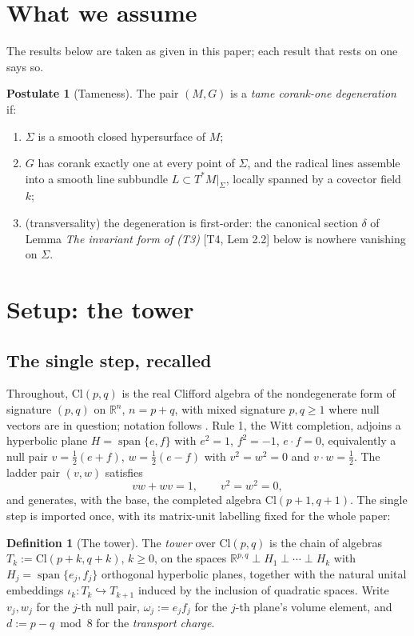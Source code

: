 \documentclass[11pt]{article}
\theoremstyle{definition}
\newtheorem{definition}[theorem]{Definition}
\newtheorem{postulate}[theorem]{Postulate}
\theoremstyle{plain}
\providecommand{\Cl}{}\renewcommand{\Cl}{\mathrm{Cl}}
\providecommand{\R}{}\renewcommand{\R}{\mathbb{R}}
\providecommand{\Sig}{}\renewcommand{\Sig}{\Sigma}
\providecommand{\shL}{}\renewcommand{\shL}{L}
\begin{document}
\section*{What we assume}
The results below are taken as given in this paper; each result that rests on one says so.
\begin{postulate}[Tameness]\label{c:sheaf.tameness}
The pair $(M, G)$ is a \emph{tame corank-one degeneration} if:
\begin{enumerate}
\item[(T1)] $\Sig$ is a smooth closed hypersurface of $M$;
\item[(T2)] $G$ has corank exactly one at every point of $\Sig$, and the radical lines assemble into a smooth line subbundle $\shL \subset T^*M|_\Sig$, locally spanned by a covector field $k$;
\item[(T3)] (transversality) the degeneration is first-order: the canonical section $\delta$ of Lemma \emph{The invariant form of (T3)} [T4, Lem 2.2] below is nowhere vanishing on $\Sig$.
\end{enumerate}
\end{postulate}

\section{Setup: the tower}

\subsection*{The single step, recalled}
\label{c:note.tower.setting-single-step-recalled}
Throughout, $\Cl(p,q)$ is the real Clifford algebra of the nondegenerate form of signature $(p,q)$ on $\R^n$, $n = p + q$, with mixed signature $p, q \geq 1$ where null vectors are in question; notation follows \cite{ButlerT1}. Rule 1, the Witt completion, adjoins a hyperbolic plane $H = \operatorname{span}\{e, f\}$ with $e^2 = 1$, $f^2 = -1$, $e \cdot f = 0$, equivalently a null pair $v = \tfrac12(e+f)$, $w = \tfrac12(e-f)$ with $v^2 = w^2 = 0$ and $v \cdot w = \tfrac12$. The ladder pair $(v, w)$ satisfies
\begin{equation}
vw + wv = 1, \qquad v^2 = w^2 = 0,
\end{equation}
and generates, with the base, the completed algebra $\Cl(p{+}1, q{+}1)$. The single step is imported once, with its matrix-unit labelling fixed for the whole paper:

\begin{definition}[The tower]\label{c:obj.tower.tower}
The \emph{tower} over $\Cl(p,q)$ is the chain of algebras $T_k := \Cl(p{+}k, q{+}k)$, $k \geq 0$, on the spaces $\R^{p,q} \perp H_1 \perp \cdots \perp H_k$ with $H_j = \operatorname{span}\{e_j, f_j\}$ orthogonal hyperbolic planes, together with the natural unital embeddings $\iota_k : T_k \hookrightarrow T_{k+1}$ induced by the inclusion of quadratic spaces. Write $v_j, w_j$ for the $j$-th null pair, $\omega_j := e_j f_j$ for the $j$-th plane's volume element, and $d := p - q \bmod 8$ for the \emph{transport charge}.
\end{definition}
\end{document}
